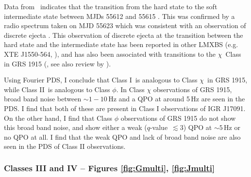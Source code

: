 \par Data from \indexrxte\rxte\  indicates that the transition from the hard state to the soft intermediate state between MJDs 55612 and 55615 \citep{Drave_Return}.  This was confirmed by a radio spectrum taken on MJD 55623 which was consistent with an observation of discrete ejecta \citep{Rodriguez_D}.  This observation of discrete ejecta at the transition between the hard state and the intermediate state has been reported in other LMXBS (e.g. XTE J1550-564, \citealp{Rodriguez_XTE}), and has also been associated with transitions to the $\chi$\indexchi\ Class in GRS 1915 (\citealp{Rodriguez_Ejection}, see also review by \citealp{Fender_Jets}).

\par Using Fourier PDS, I conclude that Class I\indexi\ is analogous to Class $\chi$\indexchi\ in GRS 1915, while Class II\indexii\ is analogous to Class $\phi$\indexphi.  In Class $\chi$ observations of GRS 1915, broad band noise between $\sim1-10$\,Hz and a QPO at around 5\,Hz are seen in the PDS.  I find that both of these are present in Class I observations of IGR J17091.  On the other hand, I find that Class $\phi$ observations of GRS 1915 do not show this broad band noise, and show either a weak ($q$-value\indexq\ $\lesssim 3$) QPO at $\sim5$\,Hz or no QPO at all.  I find that the weak QPO and lack of broad band noise are also seen in the PDS of Class II observations.

\subsubsection{Classes III and IV -- Figures \ref{fig:Gmulti}, \ref{fig:Jmulti}}

